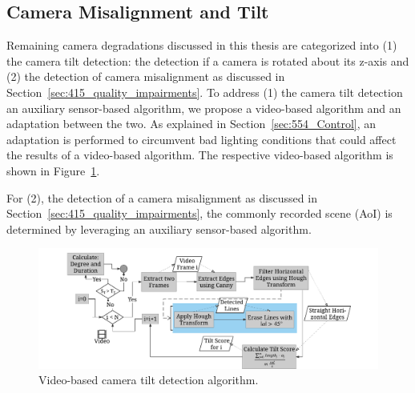 \subsection{Camera Misalignment and Tilt}
\label{sec:554_new_Camera_Misorientation}
Remaining camera degradations discussed in this thesis are categorized into (1) the camera tilt detection: the detection if a camera is rotated about its z-axis and (2) the detection of camera misalignment as discussed in Section~\ref{sec:415_quality_impairments}.
To address (1) the camera tilt detection an auxiliary sensor-based algorithm, we propose a video-based algorithm and an adaptation between the two.
As explained in Section~\ref{sec:554_Control}, an adaptation is performed to circumvent bad lighting conditions that could affect the results of a video-based algorithm.  
The respective video-based algorithm is shown in Figure~\ref{fig:554_TiltDetection}.

For (2), the detection of a camera misalignment as discussed in Section~\ref{sec:415_quality_impairments}, the commonly recorded scene (\ac{AoI}) is determined by leveraging an auxiliary sensor-based algorithm.
\begin{figure}[!htb]
  	\centering
  		\includegraphics[width=\linewidth]{./gfx/550_QA/Tilt_algorithm_Video_based}
  	\caption[Video-based tilt detection]{Video-based camera tilt detection algorithm.} %
  	\label{fig:554_TiltDetection}
\end{figure} 
